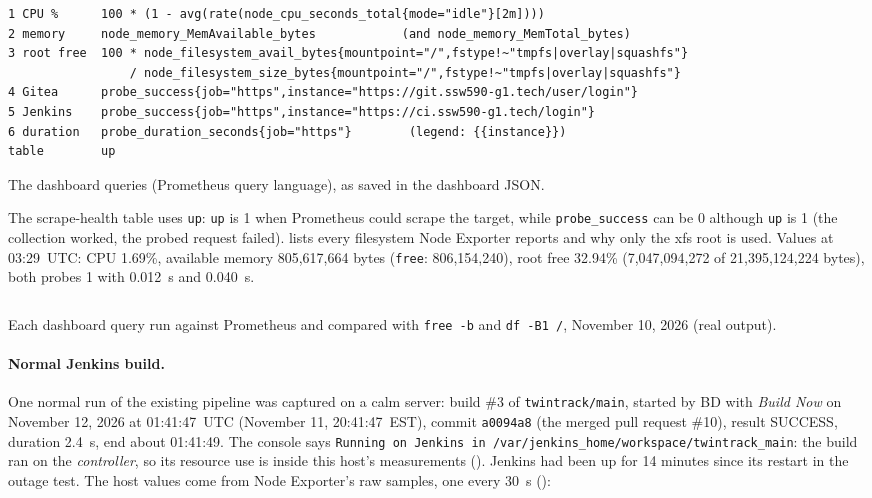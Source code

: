 \begin{longlisting}
\begin{verbatim}
1 CPU %      100 * (1 - avg(rate(node_cpu_seconds_total{mode="idle"}[2m])))
2 memory     node_memory_MemAvailable_bytes            (and node_memory_MemTotal_bytes)
3 root free  100 * node_filesystem_avail_bytes{mountpoint="/",fstype!~"tmpfs|overlay|squashfs"}
                 / node_filesystem_size_bytes{mountpoint="/",fstype!~"tmpfs|overlay|squashfs"}
4 Gitea      probe_success{job="https",instance="https://git.ssw590-g1.tech/user/login"}
5 Jenkins    probe_success{job="https",instance="https://ci.ssw590-g1.tech/login"}
6 duration   probe_duration_seconds{job="https"}        (legend: {{instance}})
table        up
\end{verbatim}
\caption{The dashboard queries (Prometheus query language), as saved in the dashboard JSON.}
\label{Listing:ESreQueries}
\end{longlisting}

The scrape-health table uses \texttt{up}: \texttt{up} is 1 when Prometheus could scrape the target, while \texttt{probe\_success} can be 0 although \texttt{up}
is 1 (the collection worked, the probed request failed).  lists every filesystem Node Exporter reports and why only the xfs root is used.
Values at 03:29~UTC: CPU 1.69\%, available memory 805,617,664 bytes (\texttt{free}: 806,154,240), root free 32.94\% (7,047,094,272 of 21,395,124,224 bytes),
both probes 1 with 0.012~s and 0.040~s.

\begin{longlisting}
\inputminted[fontsize=\scriptsize]{text}{evidence/142-dashboard-queries-checked-against-prometheus-and-host-bd-2026-11-10.txt}
\caption{Each dashboard query run against Prometheus and compared with \texttt{free -b} and \texttt{df -B1 /}, November 10, 2026 (real output).}
\label{Listing:E142}
\end{longlisting}

\paragraph{Normal Jenkins build.} One normal run of the existing pipeline was captured on a calm server: build \#3 of
\texttt{twintrack/main}, started by BD with \emph{Build Now} on November 12, 2026 at 01:41:47~UTC (November 11, 20:41:47~EST), commit
\texttt{a0094a8} (the merged pull request \#10), result SUCCESS, duration 2.4~s, end about 01:41:49. The console says
\texttt{Running on Jenkins in /var/jenkins\_home/workspace/twintrack\_main}: the build ran on the \emph{controller}, so its resource
use is inside this host's measurements (). Jenkins had been up for 14 minutes since its restart in the outage test.
The host values come from Node Exporter's raw samples, one every 30~s ():

